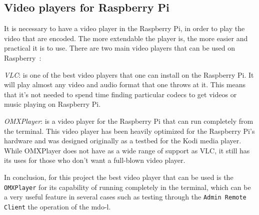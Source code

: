\subsection{Video players for Raspberry Pi}
\label{sub-sec:video-player}
It is necessary to have a video player in the Raspberry Pi, in order to play the video that are encoded.
The more extendable the player is, the more easier and practical it is to use.
There are two main video players that can be used on Raspberry~\cite{video-player-rasp}:
%
\begin{item-c}
\item \emph{VLC}: is one of the best video players that one can install on the Raspberry Pi. It will play almost any video and audio format that one throws at it. This means that it's not needed to spend time finding particular codecs to get videos or music playing on Raspberry Pi.
\item \emph{OMXPlayer}: is a video player for the Raspberry Pi that can run completely from the terminal. This video player has been heavily optimized for the Raspberry Pi's hardware and was designed originally as a testbed for the Kodi media player. While OMXPlayer does not have as a wide range of support as VLC, it still has its uses for those who don't want a full-blown video player.
\end{item-c}

In conclusion, for this project the best video player that can be used is the \texttt{OMXPlayer} for its capability of running completely in the terminal, which can be a very useful feature in several cases such as testing through the \texttt{Admin Remote Client} the operation of the \gls{mdo-l}.
